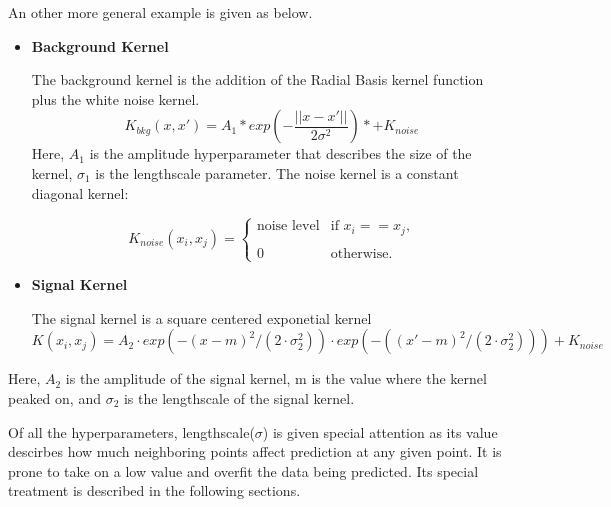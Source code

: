 An other more general example is given as below.
%
    \begin{itemize}
        \item \textbf{Background Kernel}

            The background kernel is the addition of the Radial Basis kernel function plus the white noise kernel.
            \begin{equation}
                K_{bkg}(x, x') = A_{1} * exp(-\frac{||x-x'||}{2\sigma^{2}}) *+ K_{noise}
                \label{eq:backgroundkernel}
            \end{equation}
            Here, $A_{1}$ is the amplitude hyperparameter that describes the size of the kernel, $\sigma_{1}$ is the lengthscale parameter.
            The noise kernel is a constant diagonal kernel:
            

			\begin{equation}
            K_{noise}(x_{i}, x_{j}) =
			\begin{cases} \text{noise level} & \text{if $x_{i}==x_{j}$,} \\
			\\
            0 & \text{otherwise.}
			\end{cases}
			\end{equation}

        \item \textbf{Signal Kernel}

            The signal kernel is a square centered exponetial kernel
            \begin{equation}
            K(x_{i}, x_{j})=A_{2}\cdot exp(-(x-m)^{2}/(2\cdot\sigma_{2}^{2}))\cdot exp(-((x'-m)^{2}/(2\cdot\sigma_{2}^{2}))) + K_{noise}
            \label{eq:signalkernel}
            \end{equation}

    \end{itemize}
            Here, $A_{2}$ is the amplitude of the signal kernel, m is the value where the kernel peaked on, and $\sigma_{2}$ is the lengthscale of the signal kernel. 

	Of all the hyperparameters, lengthscale($\sigma$) is given special attention as its value descirbes how much neighboring points affect prediction at any given point. It is prone to take on a low value and overfit the data being predicted. Its special treatment is described in the following sections.

